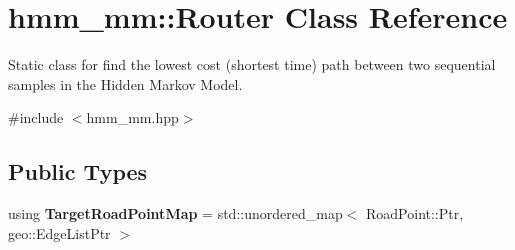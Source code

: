 \hypertarget{classhmm__mm_1_1Router}{}\section{hmm\+\_\+mm\+:\+:Router Class Reference}
\label{classhmm__mm_1_1Router}


Static class for find the lowest cost (shortest time) path between two sequential samples in the Hidden Markov Model.  




{\ttfamily \#include $<$hmm\+\_\+mm.\+hpp$>$}

\subsection*{Public Types}
\begin{DoxyCompactItemize}
\item 
using {\bfseries Target\+Road\+Point\+Map} = std\+::unordered\+\_\+map$<$ Road\+Point\+::\+Ptr, geo\+::\+Edge\+List\+Ptr $>$\hypertarget{classhmm__mm_1_1Router_a99494bcfdee07e82daa24fe929c17a4b}{}\label{classhmm__mm_1_1Router_a99494bcfdee07e82daa24fe929c17a4b}

\end{DoxyCompactItemize}
